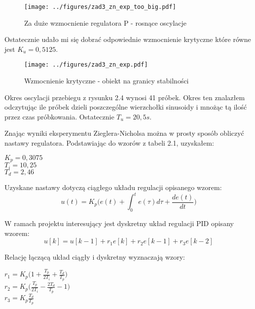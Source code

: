 \documentclass[a4paper,titlepage,11pt,floatssmall]{mwrep}
\begin{document}
\begin{figure}[H]
\centering
\texttt{[image: ../figures/zad3\_zn\_exp\_too\_big.pdf]}
\caption{Za duże wzmocnienie regulatora P - rosnące oscylacje}
\end{figure}

Ostatecznie udało mi się dobrać odpowiednie wzmocnienie krytyczne które równe jest $K_u = 0,5125$.

\begin{figure}[H]
\centering
\texttt{[image: ../figures/zad3\_zn\_exp.pdf]}
\caption{Wzmocnienie krytyczne - obiekt na granicy stabilności}
\end{figure}

\newpage

Okres oscylacji przebiegu z rysunku 2.4 wynosi 41 próbek. Okres ten znalazłem odczytując ile próbek dzieli poszczególne wierzchołki sinusoidy i mnożąc tą ilość przez czas próbkowania. Ostatecznie $T_u = 20,5s$.

Znając wyniki eksperymentu Zieglera-Nicholsa można w prosty sposób obliczyć nastawy regulatora. Podstawiając do wzorów z tabeli 2.1, uzyskałem:

\begin{center}
	$K_p = 0,3075$ \\
	
	$T_i = 10,25$ \\

	$T_d = 2,46$ \\
\end{center}

Uzyskane nastawy dotyczą ciągłego układu regulacji opisanego wzorem:
\begin{equation*}
u(t) = K_p\bigg(e(t) + \int_{0}^{t}e(\tau)d\tau + \frac{de(t)}{dt}\bigg)
\end{equation*}

W ramach projektu interesujący jest dyskretny układ regulacji PID opisany  wzorem:
\begin{equation*}
u[k] = u[k-1] + r_1e[k] + r_2e[k-1] + r_3e[k-2]
\end{equation*}

Relację łączącą układ ciągły i dyskretny wyznaczają wzory:
\begin{center}
	$r_1 = K_p\bigg(1 + \frac{T_p}{2T_i} + \frac{T_d}{T_p}\bigg)$ \\
	
	$r_2 = K_p\bigg(\frac{T_p}{2T_i} - \frac{2T_d}{T_p} - 1 \bigg)$\\

	$r_3 = K_p\frac{T_d}{T_p}$ \\
\end{center}
\end{document}
